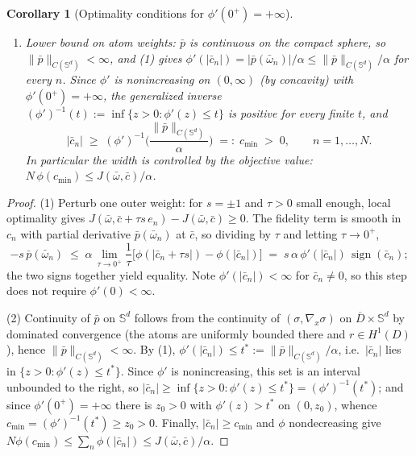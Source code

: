 \documentclass[11pt]{amsart}
\newtheorem{corollary}[theorem]{Corollary}
\theoremstyle{definition}
\theoremstyle{remark}
\DeclareMathOperator{\sign}{sign}
\begin{document}
\begin{corollary}[Optimality conditions for $\phi'(0^+) = +\infty$]
\begin{enumerate}
\begin{equation*}
	\end{equation*}
	\item Lower bound on atom weights: $\bar{p}$ is continuous on the compact
	sphere, so $\|\bar{p}\|_{C(\mathbb{S}^d)} < \infty$, and (1) gives
	$\phi'(|\bar{c}_n|) = |\bar{p}(\bar{\omega}_n)|/\alpha
	\le \|\bar{p}\|_{C(\mathbb{S}^d)}/\alpha$ for every $n$.
	Since $\phi'$ is nonincreasing on $(0, \infty)$ (by concavity) with
	$\phi'(0^+) = +\infty$, the generalized inverse
	$(\phi')^{-1}(t) := \inf\{z > 0 : \phi'(z) \le t\}$ is positive for every
	finite $t$, and
	\begin{equation*}
		|\bar{c}_n| \;\ge\; (\phi')^{-1}\!\Big(\frac{\|\bar{p}\|_{C(\mathbb{S}^d)}}{\alpha}\Big)
		\;=:\; c_{\min} \;>\; 0,
		\qquad n = 1, \dots, N.
	\end{equation*}
	In particular the width is controlled by the objective value:
	$N\,\phi(c_{\min}) \le J(\bar{\omega}, \bar{c})/\alpha$.
\end{enumerate}
\end{corollary}
\begin{proof}
(1) Perturb one outer weight: for $s = \pm 1$ and $\tau > 0$ small enough,
local optimality gives
$J(\bar{\omega}, \bar{c} + \tau s\, e_n) - J(\bar{\omega}, \bar{c}) \ge 0$.
The fidelity term is smooth in $c_n$ with partial derivative
$\bar{p}(\bar{\omega}_n)$ at $\bar{c}$, so dividing by $\tau$ and letting
$\tau \to 0^+$,
\begin{equation*}
	- s\, \bar{p}(\bar{\omega}_n)
	\;\le\; \alpha\,\lim_{\tau \to 0^+}\frac{1}{\tau}
	\bigl[\phi(|\bar{c}_n + \tau s|) - \phi(|\bar{c}_n|)\bigr]
	\;=\; s\,\alpha\,\phi'(|\bar{c}_n|)\,\sign(\bar{c}_n);
\end{equation*}
the two signs together yield equality. Note $\phi'(|\bar{c}_n|) < \infty$ for
$\bar{c}_n \neq 0$, so this step does not require $\phi'(0) < \infty$.

\medskip\noindent
(2) Continuity of $\bar{p}$ on $\mathbb{S}^d$ follows from the continuity of
$(\sigma, \nabla_x \sigma)$ on $\overline{D} \times \mathbb{S}^d$ by dominated
convergence (the atoms are uniformly bounded there and $r \in H^1(D)$), hence
$\|\bar{p}\|_{C(\mathbb{S}^d)} < \infty$.
By (1), $\phi'(|\bar{c}_n|) \le t^* := \|\bar{p}\|_{C(\mathbb{S}^d)}/\alpha$,
i.e.\ $|\bar{c}_n|$ lies in $\{z > 0 : \phi'(z) \le t^*\}$. Since $\phi'$ is
nonincreasing, this set is an interval unbounded to the right, so
$|\bar{c}_n| \ge \inf\{z > 0 : \phi'(z) \le t^*\} = (\phi')^{-1}(t^*)$; and
since $\phi'(0^+) = +\infty$ there is $z_0 > 0$ with $\phi'(z) > t^*$ on
$(0, z_0)$, whence $c_{\min} = (\phi')^{-1}(t^*) \ge z_0 > 0$.
Finally, $|\bar{c}_n| \ge c_{\min}$ and $\phi$ nondecreasing give
$N \phi(c_{\min}) \le \sum_n \phi(|\bar{c}_n|) \le J(\bar{\omega}, \bar{c})/\alpha$.
\end{proof}
\end{document}
